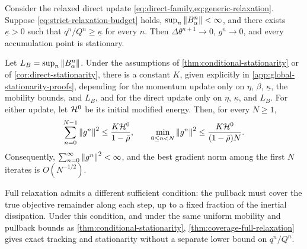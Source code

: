 \begin{corollary}
\label{cor:direct-stationarity}
Consider the relaxed direct update
\cref{eq:direct-family,eq:generic-relaxation}.  Suppose
\cref{eq:strict-relaxation-budget} holds,
\(\sup_n\left\lVert B_\alpha^n\right\rVert<\infty\), and there exists \(\underline\kappa>0\)
such that \(q^n/Q^n\geq\underline\kappa\) for every \(n\).  Then
\(\Delta\theta^{n+1}\to0\), \(g^n\to0\), and every accumulation point is
stationary.
\end{corollary}


\begin{corollary}
\label{cor:best-iterate-stationarity}
Let
\(
L_B=\sup_n\left\lVert B_\alpha^n\right\rVert
\).
Under the assumptions of \cref{thm:conditional-stationarity} or of
\cref{cor:direct-stationarity}, there is a constant \(K\), given
explicitly in \cref{app:global-stationarity-proofs}, depending for the
momentum update only on \(\eta\), \(\beta\), \(\underline\kappa\), the
mobility bounds, and \(L_B\), and for the direct update only on \(\eta\),
\(\underline\kappa\), and \(L_B\).  For either update, let \(\mathcal{H}^0\) be its
initial modified energy.  Then, for every \(N\geq1\),
\begin{equation}
  \sum_{n=0}^{N-1}\left\lVert g^n\right\rVert^2
  \leq \frac{K\mathcal{H}^0}{1-\bar\rho},
  \qquad
  \min_{0\leq n<N}\left\lVert g^n\right\rVert^2
  \leq \frac{K\mathcal{H}^0}{(1-\bar\rho)N}.
  \label{eq:best-iterate-stationarity}
\end{equation}
Consequently, \(\sum_{n=0}^\infty\left\lVert g^n\right\rVert^2<\infty\), and the best
gradient norm among the first \(N\) iterates is \(O(N^{-1/2})\).
\end{corollary}



Full relaxation admits a different sufficient condition: the pullback must
cover the true objective remainder along each step, up to a fixed fraction
of the inertial dissipation. Under this condition, and under the same uniform
mobility and pullback bounds as \cref{thm:conditional-stationarity},
\cref{thm:coverage-full-relaxation} gives exact tracking and stationarity
without a separate lower bound on \(q^n/Q^n\).
